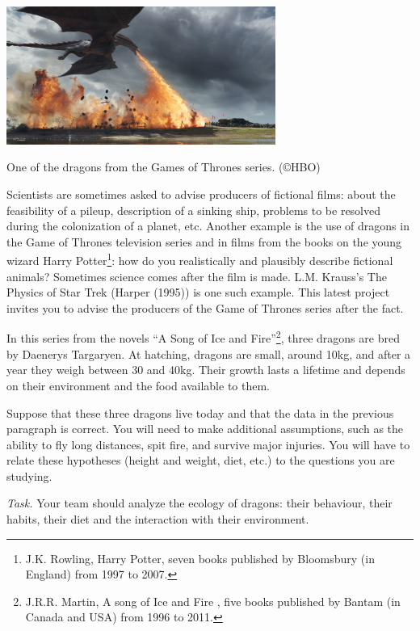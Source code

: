 \begin{center}
	\includegraphics*[width=250pt]{images/project-dragon.jpg}
	
	One of the dragons from the Games of Thrones series. (\copyright HBO)
\end{center}


Scientists are sometimes asked to advise producers of fictional films: about the feasibility of a pileup, description of a sinking ship, problems to be resolved during the colonization of a planet, etc. Another example is the use of dragons in the Game of Thrones television series and in films from the books on the young wizard Harry Potter\footnote{J.K. Rowling, Harry Potter, seven books published by Bloomsbury (in England) from 1997 to 2007.}: how do you realistically and plausibly describe fictional animals? Sometimes science comes after the film is made. L.M. Krauss's The Physics of Star Trek (Harper (1995)) is one such example. This latest project invites you to advise the producers of the Game of Thrones series after the fact.

In this series from the novels ``A Song of Ice and Fire''\footnote{J.R.R. Martin, A song of Ice and Fire , five books published by Bantam (in Canada and USA) from 1996 to 2011.}, three dragons are bred by Daenerys Targaryen. At hatching, dragons are small, around 10kg, and after a year they weigh between 30 and 40kg. Their growth lasts a lifetime and depends on their environment and the food available to them.

Suppose that these three dragons live today and that the data in the previous paragraph is correct. You will need to make additional assumptions, such as the ability to fly long distances, spit fire, and survive major injuries. You will have to relate these hypotheses (height and weight, diet, etc.) to the questions you are studying. 

\emph{Task.} Your team should analyze the ecology of dragons: their behaviour, their habits, their diet and the interaction with their environment. 

